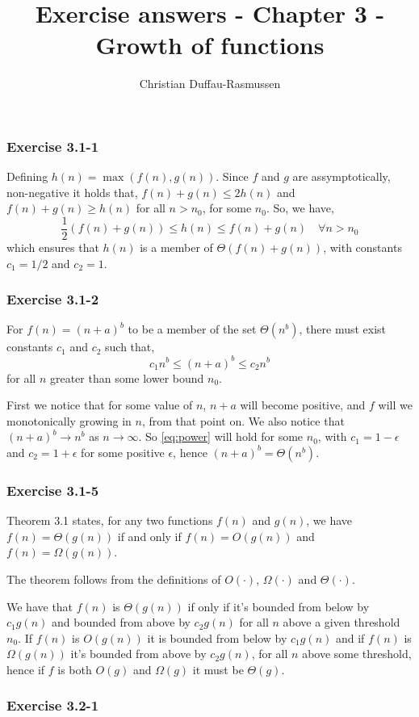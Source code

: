 \documentclass{article}
\title{Exercise answers - Chapter 3 - Growth of functions}
\author{Christian Duffau-Rasmussen}
\begin{document}
\maketitle

\subsubsection*{Exercise 3.1-1}

Defining $h(n) = \max(f(n), g(n))$. Since $f$ and $g$ are assymptotically, non-negative it holds that, $f(n)+ g(n) \leq 2h(n)$ and $f(n) + g(n)\geq h(n)$ for all $n>n_0$, for some $n_0$. So, we have,
\[
\frac{1}{2}(f(n) + g(n)) \leq h(n) \leq f(n) + g(n)\quad\forall n>n_0
\]
which ensures that $h(n)$ is a member of $\Theta(f(n) + g(n))$, with constants $c_1=1/2$ and $c_2=1$. 

\subsubsection*{Exercise 3.1-2}

For $f(n)=(n+a)^b$ to be a member of the set $\Theta(n^b)$, there must exist constants $c_1$ and $c_2$ such that,
\begin{equation} \label{eq:power}
c_1n^b \leq (n+a)^b \leq c_2n^b 
\end{equation} 
for all $n$ greater than some lower bound $n_0$.

First we notice that for some value of $n$, $n+a$ will become positive, and $f$ will we monotonically growing in $n$, from that point on.
We also notice that $(n+a)^b\rightarrow n^b$ as $n\rightarrow\infty$. So \eqref{eq:power} will hold for some $n_0$, with $c_1=1-\epsilon$ and $c_2=1+\epsilon$ for some positive $\epsilon$, hence $(n+a)^b=\Theta(n^b)$.

\subsubsection*{Exercise 3.1-5}

Theorem 3.1 states, for any two functions $f(n)$ and $g(n)$, we have $f(n)= \Theta(g(n))$ if and only if $f(n) = O(g(n))$ and $f(n) = \Omega(g(n))$.

The theorem follows from the definitions of $O(\cdot)$, $\Omega(\cdot)$ and $\Theta(\cdot)$. 

We have that $f(n)$ is $\Theta(g(n))$ if only if it's bounded from below by $c_1g(n)$ and bounded from above by $c_2g(n)$ for all $n$ above a given threshold $n_0$. If $f(n)$ is $O(g(n))$ it is bounded from below by $c_1g(n)$ and if $f(n)$ is $\Omega(g(n))$ it's bounded from above by $c_2g(n)$, for all $n$ above some threshold, hence if $f$ is both $O(g)$ and $\Omega(g)$ it must be $\Theta(g)$.

\subsubsection*{Exercise 3.2-1}
\end{document}
